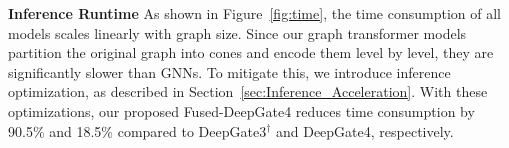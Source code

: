
\noindent\textbf{Inference Runtime} As shown in Figure~\ref{fig:time}, the time consumption of all models scales linearly with graph size. Since our graph transformer models partition the original graph into cones and encode them level by level, they are significantly slower than GNNs. To mitigate this, we introduce inference optimization, as described in Section~\ref{sec:Inference_Acceleration}. With these optimizations, our proposed Fused-DeepGate4 reduces time consumption by 90.5\% and 18.5\% compared to DeepGate3$^\dag$ and DeepGate4, respectively.
    



